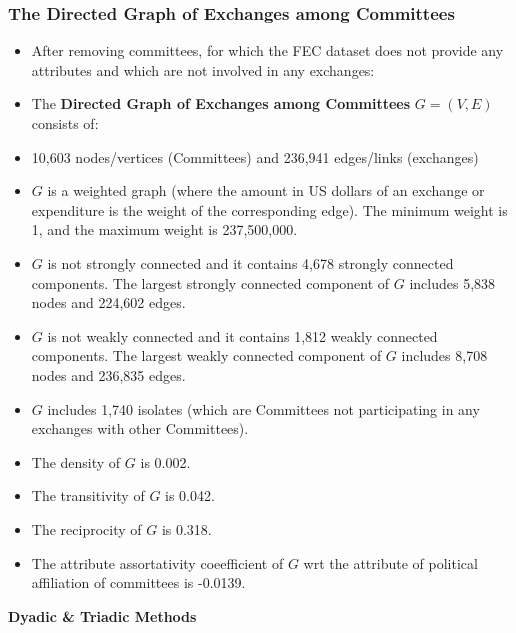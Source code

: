 \documentclass{beamer}
\begin{document}
\begin{frame}
\frametitle{The Directed Graph of Exchanges among Committees}
\scriptsize
\begin{itemize}
\item After removing committees,  for which the FEC dataset does not provide any attributes and which are not involved in any exchanges:
\item The {\bf{Directed Graph of Exchanges among Committees}} $G=(V,E)$ consists of:
\item 10,603 nodes/vertices (Committees) and 236,941 edges/links (exchanges)
\item $G$ is a weighted graph (where the amount in US dollars of an exchange or expenditure is the weight of the corresponding edge). The minimum weight is 1,  and the maximum weight is 237,500,000.
\item $G$ is not strongly connected and it contains 4,678 strongly connected components.
The largest strongly connected component of $G$ includes 5,838 nodes and 224,602 edges.
\item $G$ is not  weakly connected and it contains 1,812 weakly connected components.
The largest weakly connected component of $G$ includes 8,708 nodes and 236,835 edges.
\item $G$ includes 1,740 isolates (which are Committees not participating in any exchanges with other Committees).
\item The density of $G$ is 0.002.
\item The transitivity of $G$ is 0.042.
\item The reciprocity of $G$ is 0.318.
\item The attribute assortativity coeefficient of $G$ wrt the attribute of political affiliation of committees is -0.0139.
\end{itemize}

\end{frame}




\begin{frame}[plain,c,label=L2]

\begin{center}
\Huge {\bf{\color{orange}Dyadic \& Triadic Methods}}
\end{center}

\end{frame}
\end{document}
